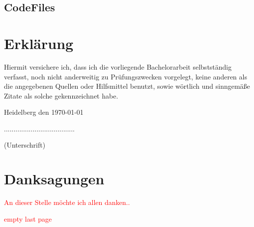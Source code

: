 \documentclass[12pt,a4paper]{article}
\newcommand\todo[1]{\textcolor{red}{#1}}
\begin{document}
\subsection*{CodeFiles}

\newpage
\section*{Erklärung}
\vspace{1cm}
Hiermit versichere ich, dass ich die vorliegende Bachelorarbeit selbstständig verfasst, noch nicht anderweitig zu Prüfungszwecken vorgelegt, keine anderen als die angegebenen Quellen oder Hilfsmittel benutzt, sowie wörtlich und sinngemäße Zitate als solche gekennzeichnet habe.\par
\bigskip

{\flushleft Heidelberg den \today } {\hfill .....................................\par}
{\hfill (Unterschrift)}

\newpage
\section*{Danksagungen}
\todo{An dieser Stelle möchte ich allen danken.. }

\newpage
\todo{empty last page}
\end{document}
